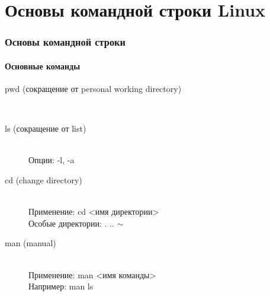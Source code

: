 \documentclass[12pt,pdf,hyperref={unicode}]{beamer}
\begin{document}

\section{Основы командной строки Linux}
\begin{frame}
\frametitle{Основы командной строки} 
\framesubtitle{Основные команды}
\begin{description}
  \item[pwd (сокращение от personal working directory)] \hfill \\
  \item[ls (сокращение от list)] \hfill \\
  Опции: -l, -a
  \item[cd (change directory)] \hfill \\
  Применение: cd <имя директории> \\
  Особые директории: . ..  $\sim$
  \item[man (manual)] \hfill \\
  Применение: man <имя команды>\\
  Например: man ls
\end{description}
\end{frame}
\end{document}
